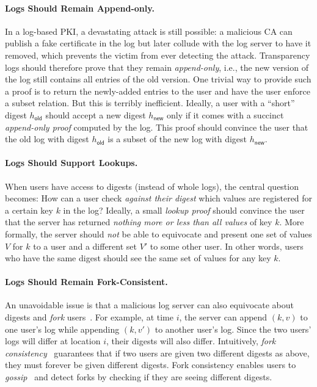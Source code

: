 \paragraph{Logs Should Remain Append-only.}
In a log-based PKI, a devastating attack is still possible: a malicious CA can publish a fake certificate in the log but later collude with the log server to have it removed, which prevents the victim from ever detecting the attack.
Transparency logs should therefore prove that they remain \emph{append-only}, i.e., the new version of the log still contains all entries of the old version.
One trivial way to provide such a proof is to return the newly-added entries to the user and have the user enforce a subset relation.
But this is terribly inefficient.
Ideally, a user with a ``short'' digest $h_{\mathsf{old}}$ should accept a new digest $h_{\mathsf{new}}$ only if it comes with a succinct \emph{append-only proof} computed by the log.
This proof should convince the user that the old log with digest $h_{\mathsf{old}}$ is a subset of the new log with digest $h_{\mathsf{new}}$.

\paragraph{Logs Should Support Lookups.}
When users have access to digests (instead of whole logs), the central question becomes: 
How can a user check \textit{against their digest} which values are registered for a certain key $k$ in the log?
Ideally, a small \emph{lookup proof} should convince the user that the server has returned \textit{nothing more or less than all values} of key $k$.
More formally, the server should \textit{not} be able to equivocate and present one set of values $V$ for $k$ to a user and a different set $V'$ to some other user.
In other words, users who have the same digest should see the same set of values for any key $k$.

\paragraph{Logs Should Remain Fork-Consistent.}
An unavoidable issue is that a malicious log server can also equivocate about digests and \textit{fork} users~\cite{LKMS04,ht}.
For example, at time $i$, the server can append $(k,v)$ to one user's log while appending $(k,v')$ to another user's log.
Since the two users' logs will differ at location $i$, their digests will also differ.
Intuitively, \textit{fork consistency}~\cite{LM07Beyond,LKMS04} guarantees that if two users are given two different digests as above, they must forever be given different digests.
Fork consistency enables users to \textit{gossip}~\cite{CSP+15,STV+16,TD17,DPV+18} and detect forks by checking if they are seeing different digests.

